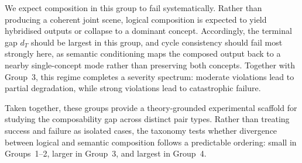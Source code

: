 \begin{enumerate}
    We expect composition in this group to fail systematically. 
    Rather than producing a coherent joint scene, logical composition is expected to yield hybridised outputs or collapse to a dominant concept. 
    Accordingly, the terminal gap $d_T$ should be largest in this group, and cycle consistency should fail most strongly here, as semantic conditioning maps the composed output back to a nearby single-concept mode rather than preserving both concepts.
    Together with Group~3, this regime completes a severity spectrum: moderate violations lead to partial degradation, while strong violations lead to catastrophic failure.

\end{enumerate}
Taken together, these groups provide a theory-grounded experimental scaffold for studying the composability gap across distinct pair types. Rather than treating success and failure as isolated cases, the taxonomy tests whether divergence between logical and semantic composition follows a predictable ordering: small in Groups~1--2, larger in Group~3, and largest in Group~4.



